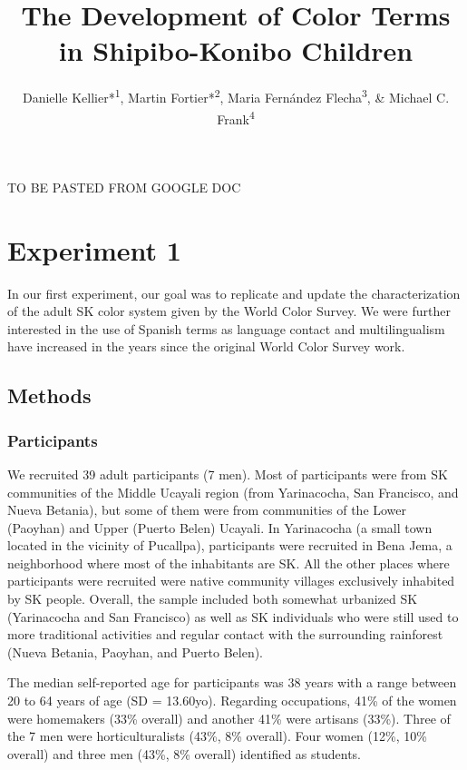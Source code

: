 \documentclass[floatsintext,man]{apa6}
\title{The Development of Color Terms in Shipibo-Konibo Children}
\author{Danielle Kellier*\textsuperscript{1}, Martin Fortier*\textsuperscript{2}, Maria Fernández Flecha\textsuperscript{3}, \& Michael C. Frank\textsuperscript{4}}
\affiliation{
    \vspace{0.5cm}
          \textsuperscript{1} University of Pennsylvania\\
          \textsuperscript{2} PSL Research University\\
          \textsuperscript{3} Pontificia Universidad Católica del Perú\\
          \textsuperscript{4} Stanford University  }
\theoremstyle{definition}
\theoremstyle{definition}
\theoremstyle{definition}
\theoremstyle{remark}
\begin{document}
\maketitle

\setcounter{secnumdepth}{0}



TO BE PASTED FROM GOOGLE DOC

\section{Experiment 1}\label{experiment-1}

In our first experiment, our goal was to replicate and update the
characterization of the adult SK color system given by the World Color
Survey. We were further interested in the use of Spanish terms as
language contact and multilingualism have increased in the years since
the original World Color Survey work.

\subsection{Methods}\label{methods}

\subsubsection{Participants}\label{participants}

We recruited 39 adult participants (7 men). Most of participants were
from SK communities of the Middle Ucayali region (from Yarinacocha, San
Francisco, and Nueva Betania), but some of them were from communities of
the Lower (Paoyhan) and Upper (Puerto Belen) Ucayali. In Yarinacocha (a
small town located in the vicinity of Pucallpa), participants were
recruited in Bena Jema, a neighborhood where most of the inhabitants are
SK. All the other places where participants were recruited were native
community villages exclusively inhabited by SK people. Overall, the
sample included both somewhat urbanized SK (Yarinacocha and San
Francisco) as well as SK individuals who were still used to more
traditional activities and regular contact with the surrounding
rainforest (Nueva Betania, Paoyhan, and Puerto Belen).

The median self-reported age for participants was 38 years with a range
between 20 to 64 years of age (SD = 13.60yo). Regarding occupations,
41\% of the women were homemakers (33\% overall) and another 41\% were
artisans (33\%). Three of the 7 men were horticulturalists (43\%, 8\%
overall). Four women (12\%, 10\% overall) and three men (43\%, 8\%
overall) identified as students.
\end{document}
